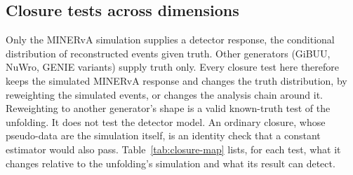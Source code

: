 \subsection{Closure tests across dimensions}
\label{sec:closure-map}

Only the MINERvA simulation supplies a detector response, the conditional distribution of reconstructed events given truth. Other generators (GiBUU, NuWro, GENIE variants) supply truth only. Every closure test here therefore keeps the simulated MINERvA response and changes the truth distribution, by reweighting the simulated events, or changes the analysis chain around it. Reweighting to another generator's shape is a valid known-truth test of the unfolding. It does not test the detector model. An ordinary closure, whose pseudo-data are the simulation itself, is an identity check that a constant estimator would also pass. Table~\ref{tab:closure-map} lists, for each test, what it changes relative to the unfolding's simulation and what its result can detect.

